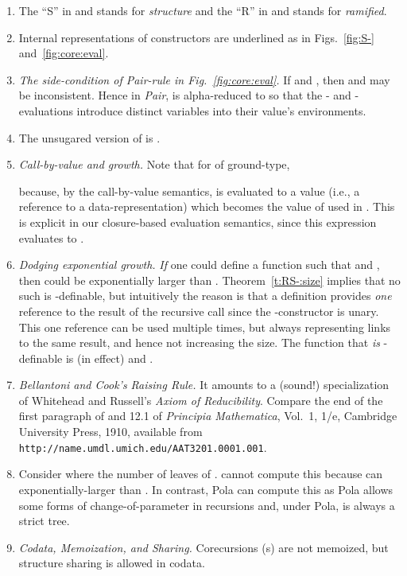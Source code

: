 \documentclass[envcountsame]{llncs}
\begin{document}
\begin{enumerate}
 \item 
    The ``S'' in  and  stands for \emph{structure} and 
    the ``R'' in  and  stands for \emph{ramified}.
 \item 
    Internal 
    representations of constructors are {underlined}
    as in Figs.~\ref{fig:S-} and~\ref{fig:core:eval}.
 \item 
   \emph{The side-condition of \emph{Pair}-rule in 
   Fig.~\ref{fig:core:eval}.}
   If  and 
   , then  and  
   may  be inconsistent. Hence in \emph{Pair},  is alpha-reduced
   to  so that the - and -evaluations introduce 
   distinct
   variables into their value's environments.
\item 
    The unsugared version of  is
	.


 \item 
   \emph{Call-by-value and growth.}
Note that for  of ground-type,    
     
   because, by the call-by-value semantics,  is evaluated to a 
   value  (i.e., a reference to a data-representation) which 
   becomes the value of  used in . This is explicit in 
   our closure-based evaluation semantics, since this expression 
   evaluates to .
 \item  
   \emph{Dodging exponential growth.}
   \emph{If} one could define a function  such that
    and , then
    could be exponentially larger than . 
   Theorem~\ref{t:RS-:size} implies that no such  is -definable, but intuitively the reason is  that 
a  definition provides \emph{one} reference to the
   result of the recursive call since the -constructor is
   unary.  This one reference can be used multiple times, but always
   representing links to the same result, and hence not increasing the
   size.  The function that \emph{is} -definable is (in effect)
    and .   
   
 \item 
    \emph{Bellantoni and Cook's Raising Rule.}  It amounts to a (sound!) 
    specialization of  Whitehead and Russell's \emph{Axiom of 
    Reducibility}.  Compare the end of the first paragraph of 
    \cite[\S5]{BellantoniCook} and 12.1 of 
    \emph{Principia Mathematica}, Vol.~1, 1/e, Cambridge University Press, 
    1910,  available from 
    \texttt{http://name.umdl.umich.\allowbreak{}edu/AAT3201.0001.001}.

\item 
  Consider  where 
   the number of leaves of .
   cannot compute this because 
  can   exponentially-larger than .
  In contrast, Pola can compute this as Pola
  allows some forms of change-of-parameter in recursions and,
  under Pola,  is always a strict tree.
\item 
  \emph{Codata, Memoization, and Sharing.}
  Corecursions (s) are not memoized, but structure
  sharing is allowed in codata. 



\end{enumerate}
\end{document}
